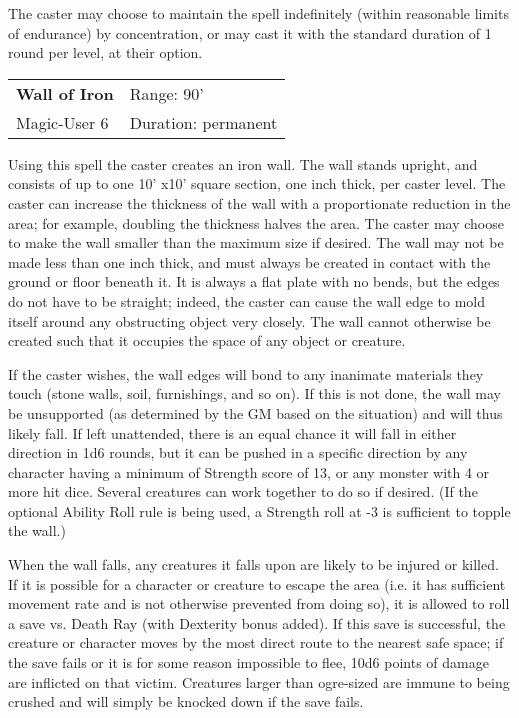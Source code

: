 \documentclass[a4paper,twoside,openany,10pt]{book}
\begin{document}
\begin{multicols}{2}
The caster may choose to maintain the spell indefinitely (within reasonable limits of endurance) by concentration, or may cast it with the standard duration of 1 round per level, at their option.


\smallskip\begin{flushleft} 
	\begin{tabularx}{0.45\textwidth}{@{}m{3.5cm}m{5.5cm}@{}} 
		\textbf{Wall of Iron} & Range: 90'\\
		Magic-User 6 &Duration: permanent\\
	\end{tabularx}\end{flushleft}

Using this spell the caster creates an iron wall. The wall stands upright, and consists of up to one 10' x10' square section, one inch thick, per caster level. The caster can increase the thickness of the wall with a proportionate reduction in the area; for example, doubling the thickness halves the area. The caster may choose to make the wall smaller than the maximum size if desired. The wall may not be made less than one inch thick, and must always be created in contact with the ground or floor beneath it. It is always a flat plate with no bends, but the edges do not have to be straight; indeed, the caster can cause the wall edge to mold itself around any obstructing object very closely. The wall cannot otherwise be created such that it occupies the space of any object or creature.

If the caster wishes, the wall edges will bond to any inanimate materials they touch (stone walls, soil, furnishings, and so on). If this is not done, the wall may be unsupported (as determined by the GM based on the situation) and will thus likely fall. If left unattended, there is an equal chance it will fall in either direction in 1d6 rounds, but it can be pushed in a specific direction by any character having a minimum of Strength score of 13, or any monster with 4 or more hit dice. Several creatures can work together to do so if desired. (If the optional Ability Roll rule is being used, a Strength roll at -3 is sufficient to topple the wall.)

When the wall falls, any creatures it falls upon are likely to be injured or killed. If it is possible for a character or creature to escape the area (i.e. it has sufficient movement rate and is not otherwise prevented from doing so), it is allowed to roll a save vs. Death Ray (with Dexterity bonus added). If this save is successful, the creature or character moves by the most direct route to the nearest safe space; if the save fails or it is for some reason impossible to flee, 10d6 points of damage are inflicted on that victim. Creatures larger than ogre-sized are immune to being crushed and will simply be knocked down if the save fails.


\end{multicols}
\end{document}
